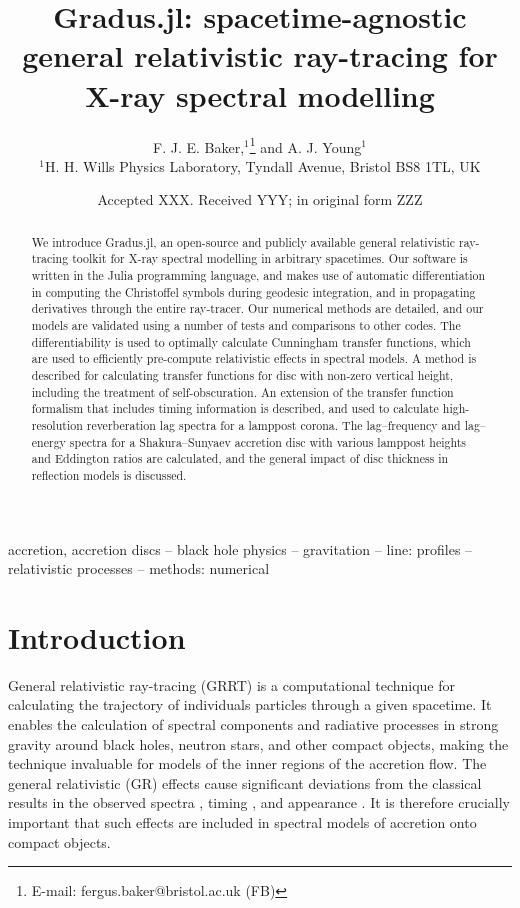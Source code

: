 \documentclass[fleqn,usenatbib]{mnras}
\title[Gradus.jl]{Gradus.jl: spacetime-agnostic general relativistic ray-tracing
for X-ray spectral modelling}
\author[F. J. E. Baker et al.]{
F. J. E. Baker,$^{1}$\thanks{E-mail: fergus.baker@bristol.ac.uk (FB)}
and A. J. Young$^{1}$
\\
$^{1}$H. H. Wills Physics Laboratory, Tyndall Avenue, Bristol BS8 1TL, UK
}
\date{Accepted XXX. Received YYY; in original form ZZZ}
\newcommand{\Gradus}{{\sc Gradus.jl}\xspace}
\begin{document}
\label{firstpage}
\pagerange{\pageref{firstpage}--\pageref{lastpage}}
\maketitle

\begin{abstract}
We introduce \Gradus, an open-source and publicly available general relativistic
ray-tracing toolkit for X-ray spectral modelling in arbitrary spacetimes. Our
software is written in the Julia programming language, and makes use of
automatic differentiation in computing the Christoffel symbols during geodesic
integration, and in propagating derivatives through the entire ray-tracer. Our
numerical methods are detailed, and our models are validated using a number of
tests and comparisons to other codes. The differentiability is used to optimally
calculate Cunningham transfer functions, which are used to efficiently
pre-compute relativistic effects in spectral models. A method is described for
calculating transfer functions for disc with non-zero vertical height, including
the treatment of self-obscuration. An extension of the transfer function
formalism that includes timing information is described, and used to calculate
high-resolution reverberation lag spectra for a lamppost corona. The
lag--frequency and lag--energy spectra for a Shakura--Sunyaev accretion disc
with various lamppost heights and Eddington ratios are calculated, and the
general impact of disc thickness in reflection models is discussed.
\end{abstract}

\begin{keywords}
accretion, accretion discs -- black hole physics -- gravitation -- line: profiles -- relativistic processes -- methods: numerical
\end{keywords}



\section{Introduction}

General relativistic ray-tracing (GRRT) is a computational technique for
calculating the trajectory of individuals particles through a given spacetime.
It enables the calculation of spectral components and radiative processes in
strong gravity around black holes, neutron stars, and other compact objects,
making the technique invaluable for models of the inner regions of the accretion
flow. The general relativistic (GR) effects cause significant deviations from
the classical results in the observed spectra
\citep[e.g.][]{cunningham_optical_1973, fabian_long_2002}, timing
\citep[e.g.][]{stella_measuring_1990, reynolds_x-ray_1999}, and appearance
\citep[e.g.][]{luminet_image_1979}. It is therefore crucially important that
such effects are included in spectral models of accretion onto compact objects.
\end{document}
